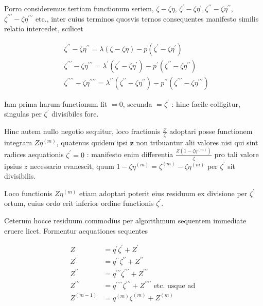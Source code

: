 \documentclass[10pt]{article}
\begin{document}
Porro consideremus tertiam functionum seriem, \(\zeta-\zeta \eta\), \(\zeta^{\prime}-\zeta \eta^{\prime}, \zeta^{\prime \prime}-\zeta \eta^{\prime \prime}\), \(\zeta^{\prime \prime \prime}-\zeta \eta^{\prime \prime \prime}\) etc., inter cuius terminos quosvis ternos consequentes manifesto similis relatio intercedet, scilicet

\[
\begin{aligned}
& \zeta^{\prime \prime}-\zeta \eta^{\prime \prime}=\lambda(\zeta-\zeta \eta)-p\left(\zeta^{\prime}-\zeta \eta^{\prime}\right) \\
& \zeta^{\prime \prime \prime}-\zeta \eta^{\prime \prime \prime}=\lambda^{\prime}\left(\zeta^{\prime}-\zeta \eta^{\prime}\right)-p^{\prime}\left(\zeta^{\prime \prime}-\zeta \eta^{\prime \prime}\right) \\
& \zeta^{\prime \prime \prime \prime}-\zeta \eta^{\prime \prime \prime \prime}=\lambda^{\prime \prime}\left(\zeta^{\prime \prime}-\zeta \eta^{\prime \prime}\right)-p^{\prime \prime}\left(\zeta^{\prime \prime \prime}-\zeta \eta^{\prime \prime \prime}\right)
\end{aligned}
\]

Iam prima harum functionum fit \(=0\), secunda \(=\zeta^{\prime}\) : hinc facile colligitur, singulas per \(\zeta^{\prime}\) divisibiles fore.

Hinc autem nullo negotio sequitur, loco fractionis \(\frac{Z}{\zeta}\) adoptari posse functionem integram \(Z \eta^{(m)}\), quatenus quidem ipsi \(\boldsymbol{z}\) non tribuantur alii valores nisi qui sint radices aequationis \(\zeta^{\prime}=0\) : manifesto enim differentia \(\frac{Z\left(1-\zeta \eta^{(m)}\right)}{\zeta}\) pro tali valore ipsius \(z\) necessario evanescit, quum \(1-\zeta \eta^{(m)}=\zeta^{(m)}-\zeta \eta^{(m)}\) per \(\zeta^{\prime}\) sit divisibilis.

Loco functionis \(Z \eta^{(m)}\) etiam adoptari poterit eius residuum ex divisione per \(\zeta^{\prime}\) ortum, cuius ordo erit inferior ordine functionis \(\zeta^{\prime}\).

Ceterum hocce residuum commodius per algorithmum sequentem immediate eruere licet. Formentur aequationes sequentes

\[
\begin{aligned}
Z & =q^{\prime} \zeta^{\prime}+Z^{\prime} \\
Z^{\prime} & =q^{\prime \prime} \zeta^{\prime \prime}+Z^{\prime \prime} \\
Z^{\prime \prime} & =q^{\prime \prime \prime} \zeta^{\prime \prime \prime}+Z^{\prime \prime \prime} \\
Z^{\prime \prime \prime} & =q^{\prime \prime \prime \prime} \zeta^{\prime \prime \prime}+Z^{\prime \prime \prime \prime} \text { etc. usque ad } \\
Z^{(m-1)} & =q^{(m)} \zeta^{(m)}+Z^{(m)}
\end{aligned}
\]
\end{document}

